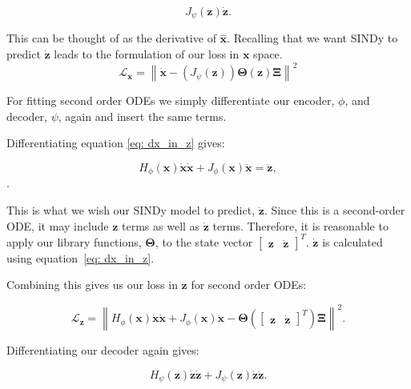 \begin{equation}
\label{eq: dx_in_z}
    J_{\psi} (\mathbf{z}) \dot{\mathbf{z}}.
\end{equation}

This can be thought of as the derivative of $\hat{\mathbf{x}}$. Recalling that we want SINDy to predict $\dot{\mathbf{z}}$ leads to the formulation of our loss in \(\mathbf{x}\) space.
$$
\mathcal{L}_{\mathbf{x}} = \left\|\dot{\mathbf{x}} - \left(J_{\psi}(\mathbf{z})\right) \boldsymbol{\Theta}(\mathbf{z}) \boldsymbol{\Xi}\right\|^2
$$

For fitting second order ODEs we simply differentiate our encoder, $\phi$, and decoder, $\psi$, again and insert the same terms. 

Differentiating equation \ref{eq: dx_in_z} gives:

\begin{equation}
H_{\phi} (\mathbf{x}) \dot{\mathbf{x}} \dot{\mathbf{x}} + J_{\phi} (\mathbf{x}) \ddot{\mathbf{x}} = \ddot{\mathbf{z}},
\end{equation}.

This is what we wish our SINDy model to predict, $\ddot{\mathbf{z}}$. Since this is a second-order ODE, it may include $\mathbf{z}$ terms as well as $\dot{\mathbf{z}}$ terms. Therefore, it is reasonable to apply our library functions, $\boldsymbol{\Theta}$, to the state vector $\begin{bmatrix} \mathbf{z} & \dot{\mathbf{z}} \end{bmatrix}^T$. $\dot{\mathbf{z}}$ is calculated using equation~\ref{eq: dx_in_z}.

Combining this gives us our loss in $\mathbf{z}$ for second order ODEs:

\begin{equation}
\label{eq: loss_z_2}
    \mathcal{L}_{\mathbf{z}} = \left\|H_{\phi} (\mathbf{x}) \dot{\mathbf{x}} \dot{\mathbf{x}} + J_{\phi} (\mathbf{x}) \ddot{\mathbf{x}} - \boldsymbol{\Theta}\left(\begin{bmatrix} \mathbf{z} & \dot{\mathbf{z}} \end{bmatrix}^T\right) \boldsymbol{\Xi}\right\|^2.
\end{equation}

Differentiating our decoder again gives:

\begin{equation}
\label{eq: dx_in_z}
    H_{\psi} (\mathbf{z}) \dot{\mathbf{z}} \dot{\mathbf{z}} + J_{\psi} (\mathbf{z})\dot{\mathbf{z}} \ddot{\mathbf{z}}.
\end{equation}

